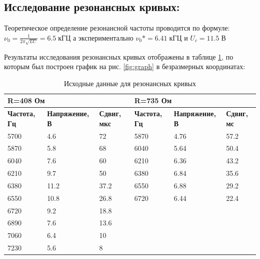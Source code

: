 \documentclass[a4paper,12pt]{article}
\begin{document}
\begin{enumerate}
\newpage

 \subsection{Исследование резонансных кривых:}
Теоретическое определение резонансной частоты проводится по формуле:
	$\nu_0 = \frac{1}{2 \pi \sqrt{L C}} = 6.5 \; кГЦ $
 а экспериментально $\nu_0* = 6.41 \; кГЦ $ и ${U_c}=11.5\; В$

Результаты исследования резонансных кривых отображены в таблице \ref{tabb}, по которым был построен график на рис. \ref{fig:graph} в безразмерных координатах:



\begin{table}[h]
	\centering
	\begin{tabular}{|l|l|l|l||l||l|}
		\hline
		\multicolumn{3}{|l|}{\textbf{R=408 Ом}}         & \multicolumn{3}{l|}{\textbf{R=735 Ом}}        \\ \hline
		\textbf{Частота, Гц} & \textbf{Напряжение, В} & \textbf{Сдвиг, мкс} & \textbf{Частота, Гц} & \textbf{Напряжение, В} & \textbf{Сдвиг, мс}\\ \hline
		5700                 & 4.6                           &  72       & 5870                 & 4.76                      &    57.2      \\ \hline
		5870                 & 5.8                         &      68     & 6040                 & 5.64                       &    50.4      \\ \hline
		6040                 & 7.6                         &      60     & 6210                 & 6.36                       &     43.2   \\ \hline
		6210                 & 9.7                         &     50      & 6380                 & 6.84                       &     35.6     \\ \hline
		6380                 & 11.2                         &     37.2   & 6550                 & 6.88                       &     29.2     \\ \hline
		6550                 & 10.8                        &      26.8   & 6720                 &   6.44                     &    22.4      \\ \hline
		6720                 & 9.2                        &      18.8    &                  &                   &          \\ \hline
		6890                 & 7.6                         &     13.6    &                 &                     &          \\ \hline
		7060                 & 6.4                        &      10      &                  &                          &          \\ \hline
		7230                 & 5.6                         &      8      &                    &                       &          \\ \hline
	\end{tabular}
	\caption{Исходные данные для резонансных кривых}
	\label{tabb}
\end{table}


\end{enumerate}
\end{document}
